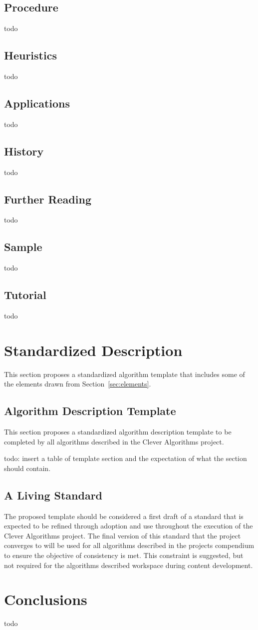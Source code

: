\documentclass[a4paper, 11pt]{article}
\begin{document}
\subsection{Procedure}
todo

\subsection{Heuristics}
todo

\subsection{Applications}
todo

\subsection{History}
todo

\subsection{Further Reading}
todo

\subsection{Sample}
todo

\subsection{Tutorial}
todo


\section{Standardized Description} 
\label{sec:template}
This section proposes a standardized algorithm template that includes some of the elements drawn from Section~\ref{sec:elements}. 

\subsection{Algorithm Description Template}
This section proposes a standardized algorithm description template to be completed by all algorithms described in the Clever Algorithms project.

todo: insert a table of template section and the expectation of what the section should contain.

\subsection{A Living Standard}
The proposed template should be considered a first draft of a standard that is expected to be refined through adoption and use throughout the execution of the Clever Algorithms project. The final version of this standard that the project converges to will be used for all algorithms described in the projects compendium to ensure the objective of consistency is met. This constraint is suggested, but not required for the algorithms described workspace during content development.

\section{Conclusions}
\label{sec:conclusions}
todo



\end{document}
